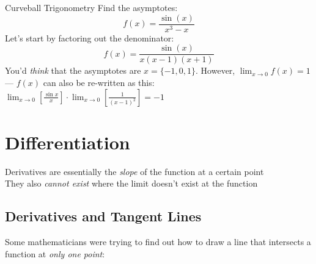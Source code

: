 \documentclass{MathNotes}
\begin{document}
\begin{example}{Curveball Trigonometry}
    Find the asymptotes:
    \begin{displaymath}
        f(x)=\frac{\sin(x)}{x^3-x}
    \end{displaymath}
    \br
    Let's start by factoring out the denominator:
    \begin{displaymath}
        f(x)=\frac{\sin(x)}{x(x-1)(x+1)}
    \end{displaymath}
    You'd \textit{think} that the asymptotes are $x=\{-1, 0, 1\}$. However,
    $\lim_{x\to 0}f(x)=1$ --- $f(x)$ can also be re-written as this:
    $\lim_{x\to 0}[\frac{\sin x}{x}] \cdot \lim_{x\to 0}[\frac{1}{(x-1)^2}]=-1$
\end{example}

\newpage
\section{Differentiation}

\begin{note}{}
    Derivatives are essentially the \textit{slope} of the function at a
    certain point \\
    They also \textit{cannot exist} where the limit doesn't exist at the 
    function
\end{note}

\subsection{Derivatives and Tangent Lines}
Some mathematicians were trying to find out how to draw a line that intersects 
a function at \textit{only one point}:
\end{document}
